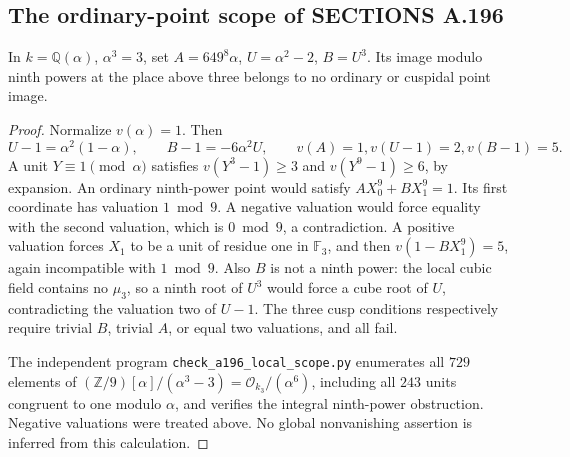 \subsection{The ordinary-point scope of SECTIONS A.196}
\begin{proposition}
\label{prop:ghost-a196-scope}
In \(k=\mathbb Q(\alpha)\), \(\alpha^3=3\), set
\(A=649^8\alpha\), \(U=\alpha^2-2\), \(B=U^3\).
Its image modulo ninth powers at the place above three belongs
to no ordinary or cuspidal point image.
\end{proposition}
\begin{proof}
Normalize \(v(\alpha)=1\). Then
\[
 U-1=\alpha^2(1-\alpha),\qquad B-1=-6\alpha^2U,
 \qquad v(A)=1, v(U-1)=2, v(B-1)=5.
\]
A unit \(Y\equiv1\pmod\alpha\) satisfies
\(v(Y^3-1)\ge3\) and \(v(Y^9-1)\ge6\), by expansion.
An ordinary ninth-power point would satisfy
\(AX_0^9+BX_1^9=1\). Its first coordinate has valuation
\(1\bmod9\). A negative valuation would force equality with
the second valuation, which is \(0\bmod9\), a contradiction.
A positive valuation forces \(X_1\) to be a unit of residue one
in \(\mathbb F_3\), and then
\(v(1-BX_1^9)=5\), again incompatible with \(1\bmod9\).
Also \(B\) is not a ninth power: the local cubic field contains
no \(\mu_3\), so a ninth root of \(U^3\) would force a cube
root of \(U\), contradicting the valuation two of \(U-1\).
The three cusp conditions respectively require trivial \(B\),
trivial \(A\), or equal two valuations, and all fail.

The independent program \texttt{check\_a196\_local\_scope.py}
enumerates all \(729\) elements of
\((\mathbb Z/9)[\alpha]/(\alpha^3-3)
=\mathcal O_{k_3}/(\alpha^6)\), including all \(243\) units
congruent to one modulo \(\alpha\), and verifies the integral
ninth-power obstruction. Negative valuations were treated above.
No global nonvanishing assertion is inferred from this calculation.
\end{proof}
